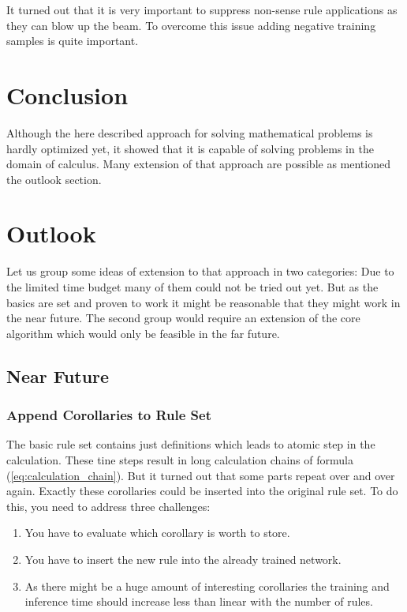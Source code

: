 \documentclass{scrartcl}
\theoremstyle{definition}
\begin{document}
It turned out that it is very important to suppress non-sense rule applications as they can blow up the beam.
To overcome this issue adding negative training samples is quite important.

\section{Conclusion}

Although the here described approach for solving mathematical problems is hardly optimized yet,
it showed that it is capable of solving problems in the domain of calculus.
Many extension of that approach are possible  as mentioned the outlook section.

\section{Outlook}

Let us group some ideas of extension to that approach in two categories:
Due to the limited time budget many of them could not be tried out yet.
But as the basics are set and proven to work it might be reasonable that they might work in the near future.
The second group would require an extension of the core algorithm which would only be feasible in the far future.

\subsection{Near Future}

\subsubsection{Append Corollaries to Rule Set}

The basic rule set contains just definitions which leads to atomic step in the calculation.
These tine steps result in long calculation chains of formula (\ref{eq:calculation_chain}).
But it turned out that some parts repeat over and over again.
Exactly these corollaries could be inserted into the original rule set.
To do this, you need to address three challenges:

\begin{enumerate}[label=(\roman*)]
	\item You have to evaluate which corollary is worth to store.
	\item You have to insert the new rule into the already trained network.
	\item As there might be a huge amount of interesting corollaries the training and inference time should increase less than linear with the number of rules.
\end{enumerate}
\end{document}
